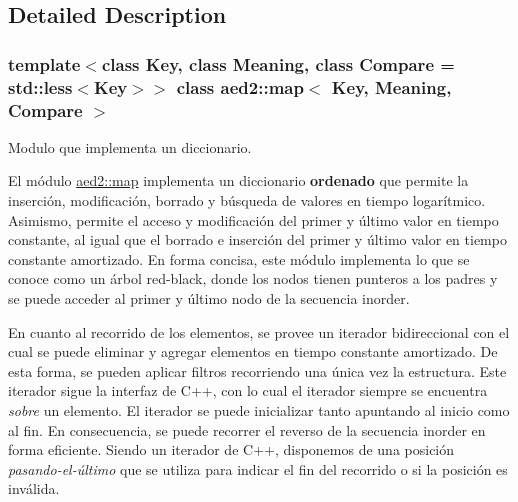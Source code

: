 \subsection{Detailed Description}
\subsubsection*{template$<$class Key, class Meaning, class Compare = std\+::less$<$\+Key$>$$>$\newline
class aed2\+::map$<$ Key, Meaning, Compare $>$}

Modulo que implementa un diccionario. 

El módulo \hyperlink{classaed2_1_1map}{aed2\+::map} implementa un diccionario {\bfseries ordenado} que permite la inserción, modificación, borrado y búsqueda de valores en tiempo logarítmico. Asimismo, permite el acceso y modificación del primer y último valor en tiempo constante, al igual que el borrado e inserción del primer y último valor en tiempo constante amortizado. En forma concisa, este módulo implementa lo que se conoce como un árbol red-\/black, donde los nodos tienen punteros a los padres y se puede acceder al primer y último nodo de la secuencia inorder.

En cuanto al recorrido de los elementos, se provee un iterador bidireccional con el cual se puede eliminar y agregar elementos en tiempo constante amortizado. De esta forma, se pueden aplicar filtros recorriendo una única vez la estructura. Este iterador sigue la interfaz de C++, con lo cual el iterador siempre se encuentra {\itshape sobre} un elemento. El iterador se puede inicializar tanto apuntando al inicio como al fin. En consecuencia, se puede recorrer el reverso de la secuencia inorder en forma eficiente. Siendo un iterador de C++, disponemos de una posición {\itshape pasando-\/el-\/último} que se utiliza para indicar el fin del recorrido o si la posición es inválida.


